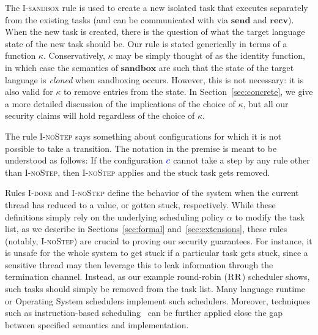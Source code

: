 \documentclass{llncs}
\begin{document}
The \textsc{I-sandbox} rule is used to create a new isolated task that
executes separately from the existing tasks (and can be communicated
with via \ensuremath{\mathbf{send}} and \ensuremath{\mathbf{recv}}).  When the new task is created, there
is the question of what the target language state of the new task should
be.  Our rule is stated generically in terms of a function \ensuremath{\kappa}.
Conservatively, \ensuremath{\kappa} may be simply thought of as the identity
function, in which
case the semantics of \ensuremath{\mathbf{sandbox}} are such that the state of the target language is \emph{cloned}
when sandboxing occurs.  However, this is not necessary: it is also valid for \ensuremath{\kappa}
to remove entries from the state.  In Section~\ref{sec:concrete}, we give a more detailed
discussion of the implications of the choice of \ensuremath{\kappa}, but all our
security claims will hold regardless of the choice of \ensuremath{\kappa}.

The rule \textsc{I-noStep} says something about configurations for which
it is not possible to take a transition.  The notation
 in the premise
is meant to be understood as
follows:  If the configuration \ensuremath{\ifc{c}} cannot take a step by any rule other
than \textsc{I-noStep}, then \textsc{I-noStep} applies and the
stuck task gets removed.

Rules \textsc{I-done} and \textsc{I-noStep} define the behavior of the system
when the current thread has reduced to a value, or gotten stuck, respectively.
While these definitions simply rely on the underlying scheduling policy
\ensuremath{\alpha} to modify the task list, as we describe in Sections~\ref{sec:formal}
and~\ref{sec:extensions}, these rules (notably, \textsc{I-noStep}) are crucial
to proving our security guarantees.
For instance, it is unsafe for the whole system to get stuck if a particular
task gets stuck, since a sensitive thread may then leverage this to leak
information through the termination channel.
Instead, as our example round-robin (\ensuremath{\textsc{RR}}) scheduler shows,
such tasks should simply be removed from the task list.
Many language runtime or Operating System schedulers implement such
schedulers.
Moreover, techniques such as instruction-based
scheduling~\cite{stefan:2013:eliminating, buiras:2013:a-library} can
be further applied close the gap between specified semantics and
implementation.
\end{document}
